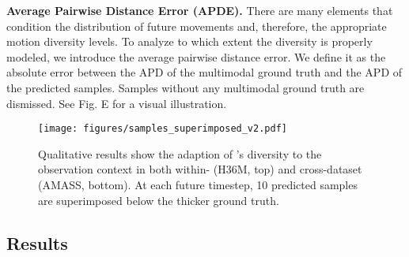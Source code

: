 \documentclass[10pt,twocolumn,letterpaper]{article}
\begin{document}
\textbf{Average Pairwise Distance Error (APDE).} There are many elements that condition the distribution of future movements and, therefore, the appropriate motion diversity levels. To analyze to which extent the diversity is properly modeled, we introduce the average pairwise distance error. We define it as the absolute error between the APD of the multimodal ground truth and the APD of the predicted samples. Samples without any multimodal ground truth are dismissed. See \supp{} Fig. E for a visual illustration.
 

\begin{figure*}[t!]
    \centering
    \texttt{[image: figures/samples\_superimposed\_v2.pdf]}
\vspace{-0.5cm}
    \caption{Qualitative results show the adaption of \modelname{}'s diversity to the observation context in both within- (H36M, top) and cross-dataset (AMASS, bottom). At each future timestep, 10 predicted samples are superimposed below the thicker ground truth.}\label{fig:qualitative_examples}\vspace{-0.4cm}
\end{figure*}

\subsection{Results}
\label{subsec:results}
\end{document}
